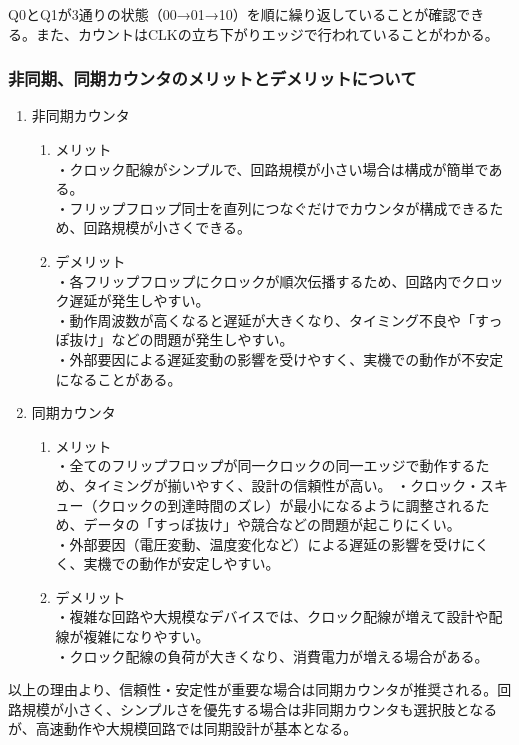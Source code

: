 \documentclass{jlreq}
\numberwithin{equation}{section}
\begin{document}
Q0とQ1が3通りの状態（00→01→10）を順に繰り返していることが確認できる。また、カウントはCLKの立ち下がりエッジで行われていることがわかる。

\subsubsection{非同期、同期カウンタのメリットとデメリットについて}
\begin{enumerate}
  \item 非同期カウンタ
  \begin{enumerate}
    \item メリット \\
    ・クロック配線がシンプルで、回路規模が小さい場合は構成が簡単である。\\
    ・フリップフロップ同士を直列につなぐだけでカウンタが構成できるため、回路規模が小さくできる。\\
    \item デメリット \\
    ・各フリップフロップにクロックが順次伝播するため、回路内でクロック遅延が発生しやすい。\\
    ・動作周波数が高くなると遅延が大きくなり、タイミング不良や「すっぽ抜け」などの問題が発生しやすい。\\
    ・外部要因による遅延変動の影響を受けやすく、実機での動作が不安定になることがある。\\
  \end{enumerate}
   \item 同期カウンタ
  \begin{enumerate}
    \item メリット \\
    ・全てのフリップフロップが同一クロックの同一エッジで動作するため、タイミングが揃いやすく、設計の信頼性が高い。
    ・クロック・スキュー（クロックの到達時間のズレ）が最小になるように調整されるため、データの「すっぽ抜け」や競合などの問題が起こりにくい。\\
    ・外部要因（電圧変動、温度変化など）による遅延の影響を受けにくく、実機での動作が安定しやすい。
    \item デメリット \\
    ・複雑な回路や大規模なデバイスでは、クロック配線が増えて設計や配線が複雑になりやすい。\\
    ・クロック配線の負荷が大きくなり、消費電力が増える場合がある。
  \end{enumerate}
\end{enumerate}

以上の理由より、信頼性・安定性が重要な場合は同期カウンタが推奨される。回路規模が小さく、シンプルさを優先する場合は非同期カウンタも選択肢となるが、高速動作や大規模回路では同期設計が基本となる。
\end{document}
